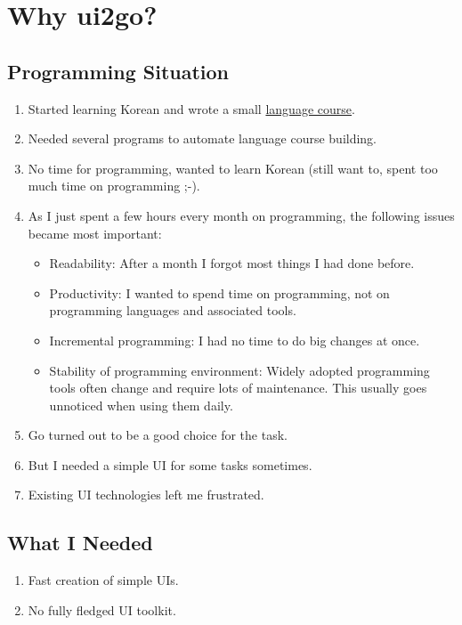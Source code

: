 \documentclass[12pt,a4paper]{article}
\begin{document}

\tableofcontents


\section{Why ui2go?}

\subsection{Programming Situation}

\begin{enumerate}
\item
  Started learning Korean and wrote a small
  \href{http://www.projectory.de/koreanisch/index.html}{language course}.
\item
  Needed several programs to automate language course building.
\item
  No time for programming, wanted to learn Korean (still want to, spent
  too much time on programming ;-).
\item
  As I just spent a few hours every month on programming, the following
  issues became most important:

  \begin{itemize}
  \item
    Readability: After a month I forgot most things I had done before.
  \item
    Productivity: I wanted to spend time on programming, not on
    programming languages and associated tools.
  \item
    Incremental programming: I had no time to do big changes at once.
  \item
    Stability of programming environment: Widely adopted programming
    tools often change and require lots of maintenance. This usually
    goes unnoticed when using them daily.
  \end{itemize}
\item
  Go turned out to be a good choice for the task.
\item
  But I needed a simple UI for some tasks sometimes.
\item
  Existing UI technologies left me frustrated.
\end{enumerate}

\subsection{What I Needed}

\begin{enumerate}
\item
  Fast creation of simple UIs.
\item
  No fully fledged UI toolkit.
\end{enumerate}
\end{document}
